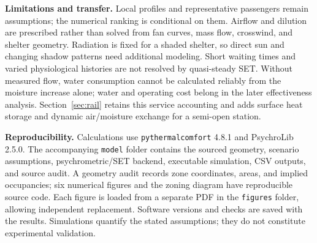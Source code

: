 \documentclass[12pt]{article}
\begin{document}
\noindent\textbf{Limitations and transfer.} Local profiles and representative passengers remain assumptions; the numerical ranking is conditional on them. Airflow and dilution are prescribed rather than solved from fan curves, mass flow, crosswind, and shelter geometry. Radiation is fixed for a shaded shelter, so direct sun and changing shadow patterns need additional modeling. Short waiting times and varied physiological histories are not resolved by quasi-steady SET. Without measured flow, water consumption cannot be calculated reliably from the moisture increase alone; water and operating cost belong in the later effectiveness analysis. Section~\ref{sec:rail} retains this service accounting and adds surface heat storage and dynamic air/moisture exchange for a semi-open station.

\noindent\textbf{Reproducibility.} Calculations use \texttt{pythermalcomfort} 4.8.1 and PsychroLib 2.5.0. The accompanying \texttt{model} folder contains the sourced geometry, scenario assumptions, psychrometric/SET backend, executable simulation, CSV outputs, and source audit. A geometry audit records zone coordinates, areas, and implied occupancies; six numerical figures and the zoning diagram have reproducible source code. Each figure is loaded from a separate PDF in the \texttt{figures} folder, allowing independent replacement. Software versions and checks are saved with the results. Simulations quantify the stated assumptions; they do not constitute experimental validation.

\clearpage

\end{document}
